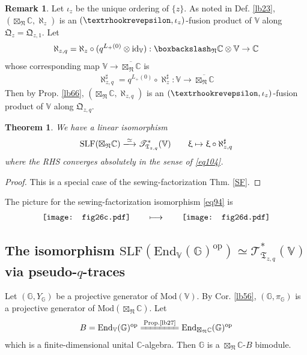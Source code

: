 \documentclass[11pt,b5paper,notitlepage]{article}
\theoremstyle{definition}
\newtheorem{rem}[df]{Remark}
\theoremstyle{plain}
\newtheorem{thm}[df]{Theorem}
\newcommand{\fk}{\mathfrak}
\newcommand{\ovl}{\overline}
\newcommand{\End}{\mathrm{End}} %
\newcommand{\opp}{\mathrm{op}}
\newcommand{\SLF}{\mathrm{SLF}}
\newcommand{\Vbb}{\mathbb V}
\newcommand{\Gbb}{\mathbb G}
\newcommand{\Cbb}{\mathbb C}
\newcommand{\<}{\left\langle}
\renewcommand{\>}{\right\rangle}
\newcommand{\ST}{\mathscr{T}}
\newcommand{\bbs}{\boxbackslash}
\newcommand{\fq}{{\mathfrak Q}}
\newcommand{\ft}{{\mathfrak T}}
\newcommand{\Mod}{\mathrm{Mod}}
\newcommand{\id}{\mathrm{id}}
\newcommand{\fn}{\mathfrak{N}}
\newcommand{\tipae}{\text{\textrhookrevepsilon}}
\numberwithin{equation}{section}
\begin{document}
\begin{rem}
Let $\iota_z$ be the unique ordering of $\{z\}$. As noted in Def. \ref{lb23}, $(\boxtimes_\fn\Cbb,\aleph_z)$ is an $(\tipae,\iota_z)$-fusion product of $\Vbb$ along $\fq_z=\fq_{z,1}$. Let
\begin{align*}
\aleph_{z,q}=\aleph_z\circ(q^{L_+(0)}\otimes\id_\Vbb):\bbs_\fn\Cbb\otimes\Vbb\rightarrow\Cbb
\end{align*}
whose corresponding map $\Vbb\rightarrow\ovl{\boxtimes_\fn\Cbb}$ is
\begin{align*}
\aleph^\sharp_{z,q}=q^{L_+(0)}\circ\aleph^\sharp_z:\Vbb\rightarrow\ovl{\boxtimes_\fn\Cbb}
\end{align*}
Then by Prop. \ref{lb66},  $(\boxtimes_\fn\Cbb,\aleph_{z,q})$ is an $(\tipae,\iota_z)$-fusion product of $\Vbb$ along $\fq_{z,q}$.
\end{rem}



\begin{thm}\label{lb69}
We have a linear isomorphism
\begin{gather}\label{eq94}
\SLF(\boxtimes_\fn\Cbb)\xlongrightarrow{\simeq}\ST^*_{\fk T_{z,q}}(\Vbb)\qquad\upxi\mapsto \upxi\circ \aleph^\sharp_{z,q}
\end{gather}
where the RHS converges absolutely in the sense of \eqref{eq104}.
\end{thm}

\begin{proof}
This is a special case of the sewing-factorization Thm. \ref{SF}.
\end{proof}

The picture for the sewing-factorization isomorphism \eqref{eq94} is
\begin{align*}
\vcenter{\hbox{{\texttt{[image: fig26c.pdf]}}}}\qquad\longmapsto\qquad \vcenter{\hbox{{\texttt{[image: fig26d.pdf]}}}}
\end{align*}




\subsection{The isomorphism $\SLF(\End_\Vbb(\Gbb)^\opp)\simeq\ST^*_{\ft_{z,q}}(\Vbb)$ via pseudo-$q$-traces}\label{lb79}

Let $(\Gbb,Y_\Gbb)$ be a projective generator of $\Mod(\Vbb)$. By Cor. \ref{lb56}, $(\Gbb,\pi_\Gbb)$ is a projective generator of $\Mod(\boxtimes_\fn\Cbb)$. Let
\begin{align*}
B=\End_\Vbb(\Gbb)^\opp\xlongequal{\text{Prop.\ref{lb27}}}\End_{\boxtimes_\fn\Cbb}(\Gbb)^\opp
\end{align*}
which is a finite-dimensional unital $\Cbb$-algebra. Then $\Gbb$ is a $\boxtimes_\fn\Cbb$-$B$ bimodule.
\end{document}
